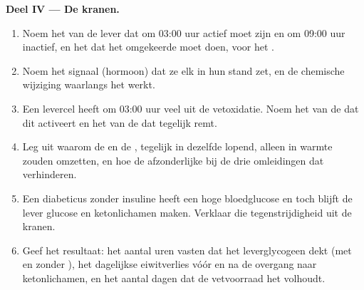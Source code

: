 \begin{problem}
\medskip
\noindent\textbf{Deel IV --- De kranen.}
\begin{enumerate}[resume]
  \item Noem het  van de lever dat om 03:00 uur actief moet zijn en om
        09:00 uur inactief, en het  dat het omgekeerde moet doen, voor
        het .
  \item Noem het signaal (hormoon) dat ze elk in hun stand zet, en de
        chemische wijziging waarlangs het werkt.
  \item Een levercel heeft om 03:00 uur veel  uit de
        vetoxidatie. Noem het  van de  dat dit
        activeert en het  van de  dat  tegelijk remt.
  \item Leg uit waarom de  en de , tegelijk in
        dezelfde  lopend, alleen  in warmte zouden omzetten, en hoe
        de afzonderlijke  bij de drie omleidingen dat verhinderen.
  \item Een diabeticus zonder insuline heeft een hoge bloedglucose en toch
        blijft de lever glucose en ketonlichamen maken. Verklaar die
        tegenstrijdigheid uit de kranen.
  \item Geef het resultaat: het aantal uren vasten dat het leverglycogeen
        dekt (met en zonder ), het dagelijkse eiwitverlies
        vóór en na de overgang naar ketonlichamen, en het aantal dagen dat
        de vetvoorraad het volhoudt.
\end{enumerate}
\end{problem}
